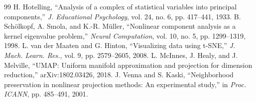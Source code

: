 \documentclass[conference,a4paper]{IEEEtran}
\begin{document}
\begin{thebibliography}{99}
 H. Hotelling, ``Analysis of a complex of statistical variables into principal components,'' \emph{J. Educational Psychology}, vol. 24, no. 6, pp. 417--441, 1933.
 B. Schölkopf, A. Smola, and K.-R. Müller, ``Nonlinear component analysis as a kernel eigenvalue problem,'' \emph{Neural Computation}, vol. 10, no. 5, pp. 1299--1319, 1998.
 L. van der Maaten and G. Hinton, ``Visualizing data using t-SNE,'' \emph{J. Mach. Learn. Res.}, vol. 9, pp. 2579--2605, 2008.
 L. McInnes, J. Healy, and J. Melville, ``UMAP: Uniform manifold approximation and projection for dimension reduction,'' arXiv:1802.03426, 2018.
 J. Venna and S. Kaski, ``Neighborhood preservation in nonlinear projection methods: An experimental study,'' in \emph{Proc. ICANN}, pp. 485--491, 2001.
\end{thebibliography}
\end{document}
